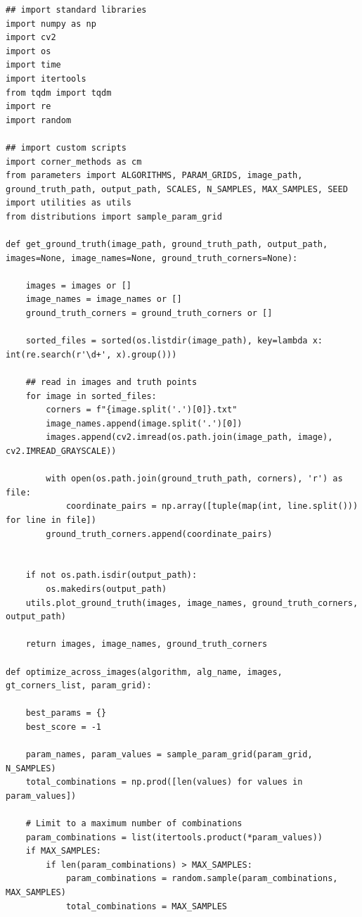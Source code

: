 \documentclass[journal]{IEEEtran}
\begin{document}
\begin{lstlisting}[style=python, caption={Driver Script for Project}, label={lst:driver}]
## import standard libraries
import numpy as np
import cv2
import os
import time
import itertools
from tqdm import tqdm
import re
import random

## import custom scripts
import corner_methods as cm
from parameters import ALGORITHMS, PARAM_GRIDS, image_path, ground_truth_path, output_path, SCALES, N_SAMPLES, MAX_SAMPLES, SEED
import utilities as utils
from distributions import sample_param_grid

def get_ground_truth(image_path, ground_truth_path, output_path, images=None, image_names=None, ground_truth_corners=None):
    
    images = images or []
    image_names = image_names or []
    ground_truth_corners = ground_truth_corners or []
    
    sorted_files = sorted(os.listdir(image_path), key=lambda x: int(re.search(r'\d+', x).group()))
    
    ## read in images and truth points
    for image in sorted_files:
        corners = f"{image.split('.')[0]}.txt"
        image_names.append(image.split('.')[0])
        images.append(cv2.imread(os.path.join(image_path, image), cv2.IMREAD_GRAYSCALE))
        
        with open(os.path.join(ground_truth_path, corners), 'r') as file:
            coordinate_pairs = np.array([tuple(map(int, line.split())) for line in file])
        ground_truth_corners.append(coordinate_pairs)
        

    if not os.path.isdir(output_path):
        os.makedirs(output_path)
    utils.plot_ground_truth(images, image_names, ground_truth_corners, output_path)
    
    return images, image_names, ground_truth_corners

def optimize_across_images(algorithm, alg_name, images, gt_corners_list, param_grid):

    best_params = {}
    best_score = -1

    param_names, param_values = sample_param_grid(param_grid, N_SAMPLES)
    total_combinations = np.prod([len(values) for values in param_values])
    
    # Limit to a maximum number of combinations
    param_combinations = list(itertools.product(*param_values))
    if MAX_SAMPLES:
        if len(param_combinations) > MAX_SAMPLES:
            param_combinations = random.sample(param_combinations, MAX_SAMPLES)
            total_combinations = MAX_SAMPLES
    

\end{lstlisting}
\end{document}
